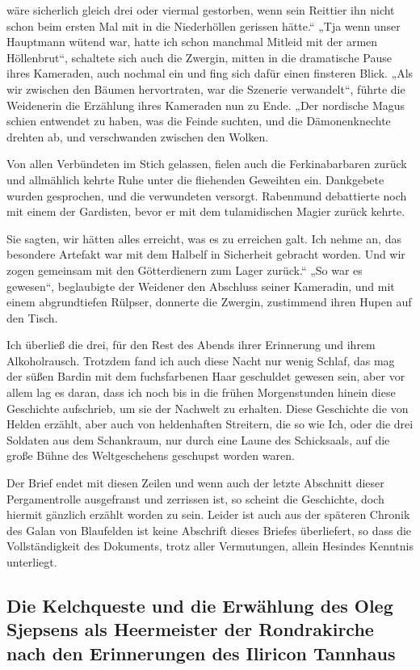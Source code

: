 wäre sicherlich gleich drei oder viermal gestorben, wenn sein Reittier ihn nicht schon beim ersten Mal mit in die Niederhöllen gerissen hätte.“ „Tja wenn unser Hauptmann wütend war, hatte ich schon manchmal Mitleid mit der armen Höllenbrut“, schaltete sich auch die Zwergin, mitten in die dramatische Pause ihres Kameraden, auch nochmal ein und fing sich dafür einen finsteren Blick. „Als wir zwischen den Bäumen hervortraten, war die Szenerie verwandelt“, führte die Weidenerin die Erzählung ihres Kameraden nun zu Ende. „Der nordische Magus schien entwendet zu haben, was die Feinde suchten, und die Dämonenknechte drehten ab, und verschwanden zwischen den Wolken.

Von allen Verbündeten im Stich gelassen, fielen auch die Ferkinabarbaren zurück und allmählich kehrte Ruhe unter die fliehenden Geweihten ein. Dankgebete wurden gesprochen, und die verwundeten versorgt. Rabenmund debattierte noch mit einem der Gardisten, bevor er mit dem tulamidischen Magier zurück kehrte.

Sie sagten, wir hätten alles erreicht, was es zu erreichen galt. Ich nehme an, das besondere Artefakt war mit dem Halbelf in Sicherheit gebracht worden. Und wir zogen gemeinsam mit den Götterdienern zum Lager zurück.“ „So war es gewesen“, beglaubigte der Weidener den Abschluss seiner Kameradin, und mit einem abgrundtiefen Rülpser, donnerte die Zwergin, zustimmend ihren Hupen auf den Tisch.

Ich überließ die drei, für den Rest des Abends ihrer Erinnerung und ihrem Alkoholrausch. Trotzdem fand ich auch diese Nacht nur wenig Schlaf, das mag der süßen Bardin mit dem fuchsfarbenen Haar geschuldet gewesen sein, aber vor allem lag es daran, dass ich noch bis in die frühen Morgenstunden hinein diese Geschichte aufschrieb, um sie der Nachwelt zu erhalten. Diese Geschichte die von Helden erzählt, aber auch von heldenhaften Streitern, die so wie Ich, oder die drei Soldaten aus dem Schankraum, nur durch eine Laune des Schicksaals, auf die große Bühne des Weltgeschehens geschupst worden waren.

Der Brief endet mit diesen Zeilen und wenn auch der letzte Abschnitt dieser Pergamentrolle ausgefranst und zerrissen ist, so scheint die Geschichte, doch hiermit gänzlich erzählt worden zu sein. Leider ist auch aus der späteren Chronik des Galan von Blaufelden ist keine Abschrift dieses Briefes überliefert, so dass die Vollständigkeit des Dokuments, trotz aller Vermutungen, allein Hesindes Kenntnis unterliegt.

\subsection{Die Kelchqueste und die Erwählung des Oleg Sjepsens als Heermeister der Rondrakirche nach den Erinnerungen des Iliricon Tannhaus}


